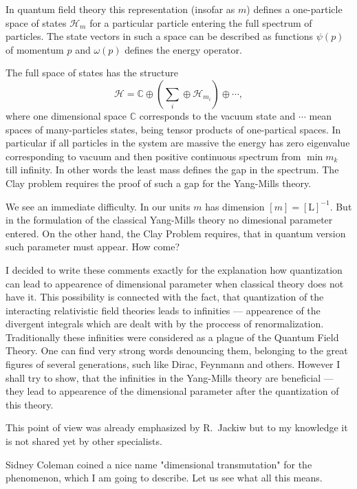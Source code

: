 \documentclass[12pt]{article}
\newcommand{\CCC}{\mathbb{C}}
\newcommand{\HH} {\mathcal{H}}
\newcommand{\Length}{\text{L}}
\begin{document}
	In quantum field theory this representation 
	(insofar as
    $ m $) 
	defines a one-particle space of states
    $ \HH_{m} $
	for a particular particle entering the full spectrum of particles.
	The state vectors in such a space can be described as
	functions
    $ \psi(p) $
	of momentum
    $ p $
	and
    $ \omega(p) $
	defines the energy operator.

	The full space of states has the structure
\begin{equation*}
        \HH = \CCC \oplus \left( \sum_{i} \oplus \HH_{m_{i}} \right)
		\oplus \cdots ,
\end{equation*}
	where one dimensional space 
    $ \CCC $
	corresponds to the vacuum state
	and 
    $ \cdots $ 
	mean spaces of many-particles states, being tensor products 
	of one-partical	spaces. 
	In particular if all particles in the system are massive
	the energy has zero eigenvalue corresponding to vacuum and then
	positive continuous spectrum from
    $ \min m_{k} $
	till infinity. In other words the least mass defines the gap in
	the spectrum. The Clay problem requires the proof of such a gap
	for the Yang-Mills theory.

	We see an immediate difficulty. In our units
    $ m $
	has dimension
    $ [m] = [ \Length ]^{-1} $.
	But in the formulation of the 
	classical Yang-Mills theory no dimesional parameter entered.
	On the other hand, the Clay Problem requires, that in quantum
	version such parameter must appear. How come?

	I decided to write these comments exactly for the explanation 
	how quantization can lead to appearence of dimensional parameter
	when classical theory does not have it. This possibility is
	connected with the fact, that quantization of the interacting
	relativistic field theories leads to infinities --- appearence
	of the divergent integrals which are dealt with by the proccess
	of renormalization. Traditionally these infinities were 
	considered as a plague of the Quantum Field Theory.
	One can find very strong words denouncing them, belonging to the
	great figures of several generations, such like Dirac, Feynmann
	and others. However I shall try to show, that the infinities in
	the Yang-Mills theory are beneficial --- they lead to
	appearence of the dimensional parameter after the quantization
	of this theory.

	This point of view was already emphasized by R.~Jackiw
\cite{RJ}
	but to my knowledge it is not shared yet by other specialists.

	Sidney Coleman
\cite{SC}
	coined a nice name "dimensional transmutation" for the phenomenon, 
	which I am going to describe. Let us see what all this
	means.
\end{document}
